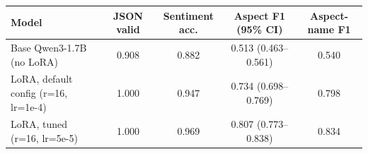 \begin{tabular}{lcccc}
\toprule
Model & JSON valid & Sentiment acc. & Aspect F1 (95\% CI) & Aspect-name F1 \\
\midrule
Base Qwen3-1.7B (no LoRA) & 0.908 & 0.882 & 0.513 (0.463--0.561) & 0.540 \\
LoRA, default config (r=16, lr=1e-4) & 1.000 & 0.947 & 0.734 (0.698--0.769) & 0.798 \\
LoRA, tuned (r=16, lr=5e-5) & 1.000 & 0.969 & 0.807 (0.773--0.838) & 0.834 \\
\bottomrule
\end{tabular}
